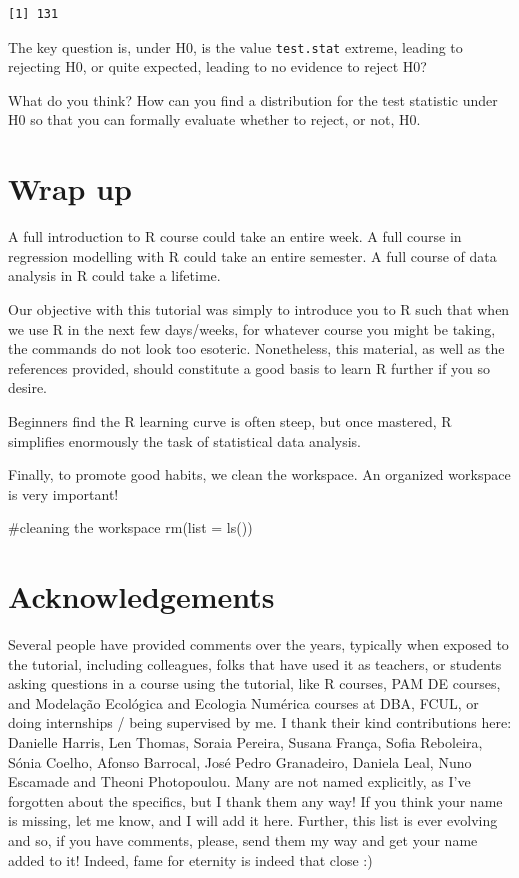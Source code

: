 \documentclass[
  letterpaper,
  DIV=11,
  numbers=noendperiod]{scrartcl}
\newenvironment{Shaded}{\begin{snugshade}}{\end{snugshade}}
\newcommand{\AttributeTok}[1]{\textcolor[rgb]{0.40,0.45,0.13}{#1}}
\newcommand{\CommentTok}[1]{\textcolor[rgb]{0.37,0.37,0.37}{#1}}
\newcommand{\FunctionTok}[1]{\textcolor[rgb]{0.28,0.35,0.67}{#1}}
\newcommand{\NormalTok}[1]{\textcolor[rgb]{0.00,0.23,0.31}{#1}}
\begin{document}
\begin{verbatim}
[1] 131
\end{verbatim}

The key question is, under H0, is the value \texttt{test.stat} extreme,
leading to rejecting H0, or quite expected, leading to no evidence to
reject H0?

What do you think? How can you find a distribution for the test
statistic under H0 so that you can formally evaluate whether to reject,
or not, H0.

\section{Wrap up}\label{wrap-up}

A full introduction to R course could take an entire week. A full course
in regression modelling with R could take an entire semester. A full
course of data analysis in R could take a lifetime.

Our objective with this tutorial was simply to introduce you to R such
that when we use R in the next few days/weeks, for whatever course you
might be taking, the commands do not look too esoteric. Nonetheless,
this material, as well as the references provided, should constitute a
good basis to learn R further if you so desire.

Beginners find the R learning curve is often steep, but once mastered, R
simplifies enormously the task of statistical data analysis.

Finally, to promote good habits, we clean the workspace. An organized
workspace is very important!

\begin{Shaded}
\begin{Highlighting}[]
\CommentTok{\#cleaning the workspace}
\FunctionTok{rm}\NormalTok{(}\AttributeTok{list =} \FunctionTok{ls}\NormalTok{())}
\end{Highlighting}
\end{Shaded}

\section{Acknowledgements}\label{acknowledgements}

Several people have provided comments over the years, typically when
exposed to the tutorial, including colleagues, folks that have used it
as teachers, or students asking questions in a course using the
tutorial, like R courses, PAM DE courses, and Modelação Ecológica and
Ecologia Numérica courses at DBA, FCUL, or doing internships / being
supervised by me. I thank their kind contributions here: Danielle
Harris, Len Thomas, Soraia Pereira, Susana França, Sofia Reboleira,
Sónia Coelho, Afonso Barrocal, José Pedro Granadeiro, Daniela Leal, Nuno
Escamade and Theoni Photopoulou. Many are not named explicitly, as I've
forgotten about the specifics, but I thank them any way! If you think
your name is missing, let me know, and I will add it here. Further, this
list is ever evolving and so, if you have comments, please, send them my
way and get your name added to it! Indeed, fame for eternity is indeed
that close :)
\end{document}
